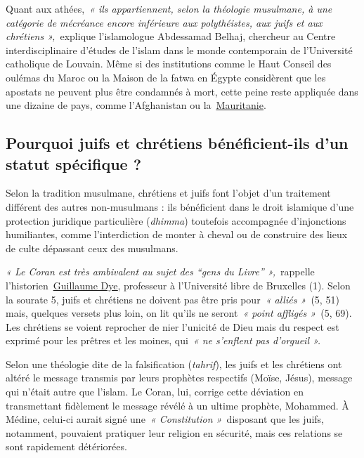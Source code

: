 Quant aux athées,~\emph{« ils appartiennent, selon la théologie
musulmane, à une catégorie de mécréance encore inférieure aux
polythéistes, aux juifs et aux chrétiens »,~}explique l'islamologue
Abdessamad Belhaj, chercheur au Centre interdisciplinaire d'études de
l'islam dans le monde contemporain de l'Université catholique de
Louvain. Même si des institutions comme le Haut Conseil des oulémas du
Maroc ou la Maison de la fatwa en Égypte considèrent que les apostats ne
peuvent plus être condamnés à mort, cette peine reste appliquée dans une
dizaine de pays, comme l'Afghanistan ou
la~\href{https://www.la-croix.com/Monde/Afrique/prisons-Mauritanie-calvaire-dun-apostat-2019-09-30-1201051050}{\underline{Mauritanie}}.

\subsection{ Pourquoi juifs et chrétiens bénéficient-ils d'un statut
spécifique ?}

Selon la tradition musulmane, chrétiens et juifs font l'objet d'un
traitement différent des autres non-musulmans : ils bénéficient dans le
droit islamique d'une protection juridique particulière (\emph{dhimma})
toutefois accompagnée d'injonctions humiliantes, comme l'interdiction de
monter à cheval ou de construire des lieux de culte dépassant ceux des
musulmans.
 

\emph{« Le Coran est très ambivalent au sujet des ``gens du Livre''
»,~}rappelle
l'historien~\href{https://www.la-croix.com/Culture/Livres-et-idees/historiens-decryptent-Coran-avant-lislam-2019-11-27-1201063090}{\underline{Guillaume
Dye}}, professeur à l'Université libre de Bruxelles (1). Selon la
sourate 5, juifs et chrétiens ne doivent pas être pris pour~\emph{«
alliés »~}(5, 51) mais, quelques versets plus loin, on lit qu'ils ne
seront~\emph{« point affligés »~}(5, 69). Les chrétiens se voient
reprocher de nier l'unicité de Dieu mais du respect est exprimé pour les
prêtres et les moines, qui~\emph{« ne s'enflent pas d'orgueil ».}

Selon une théologie dite de la falsification (\emph{tahrif}), les juifs
et les chrétiens ont altéré le message transmis par leurs prophètes
respectifs (Moïse, Jésus), message qui n'était autre que l'islam. Le
Coran, lui, corrige cette déviation en transmettant fidèlement le
message révélé à un ultime prophète, Mohammed. À Médine, celui-ci aurait
signé une~\emph{« Constitution »~}disposant que les juifs, notamment,
pouvaient pratiquer leur religion en sécurité, mais ces relations se
sont rapidement détériorées.

